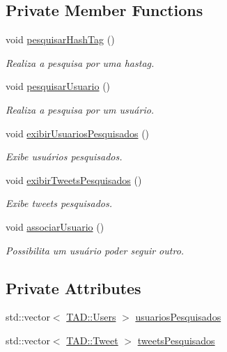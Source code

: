 \subsection*{Private Member Functions}
\begin{DoxyCompactItemize}
\item 
void \hyperlink{class_interface_1_1_pesquisa_a28a88ff5186592cdbf7a2df056e8a6ad}{pesquisar\+Hash\+Tag} ()
\begin{DoxyCompactList}\small\item\em Realiza a pesquisa por uma hastag. \end{DoxyCompactList}\item 
void \hyperlink{class_interface_1_1_pesquisa_acaa0b19a0be4285fa0e9a29e16858719}{pesquisar\+Usuario} ()
\begin{DoxyCompactList}\small\item\em Realiza a pesquisa por um usuário. \end{DoxyCompactList}\item 
void \hyperlink{class_interface_1_1_pesquisa_a489f4605a56f01a61e9d93c7f5d34b14}{exibir\+Usuarios\+Pesquisados} ()
\begin{DoxyCompactList}\small\item\em Exibe usuários pesquisados. \end{DoxyCompactList}\item 
void \hyperlink{class_interface_1_1_pesquisa_ad8f5f3dbb0409a4d331f23f4bcebccb4}{exibir\+Tweets\+Pesquisados} ()
\begin{DoxyCompactList}\small\item\em Exibe tweets pesquisados. \end{DoxyCompactList}\item 
void \hyperlink{class_interface_1_1_pesquisa_a138948564540ebb6b5f0cdc89326451b}{associar\+Usuario} ()
\begin{DoxyCompactList}\small\item\em Possibilita um usuário poder seguir outro. \end{DoxyCompactList}\end{DoxyCompactItemize}
\subsection*{Private Attributes}
\begin{DoxyCompactItemize}
\item 
std\+::vector$<$ \hyperlink{class_t_a_d_1_1_users}{T\+A\+D\+::\+Users} $>$ \hyperlink{class_interface_1_1_pesquisa_a5c4e622554020b6f73f1c7a804f96b58}{usuarios\+Pesquisados}
\item 
std\+::vector$<$ \hyperlink{class_t_a_d_1_1_tweet}{T\+A\+D\+::\+Tweet} $>$ \hyperlink{class_interface_1_1_pesquisa_a727e0bf877914015276da14ca1e8cf16}{tweets\+Pesquisados}
\end{DoxyCompactItemize}


